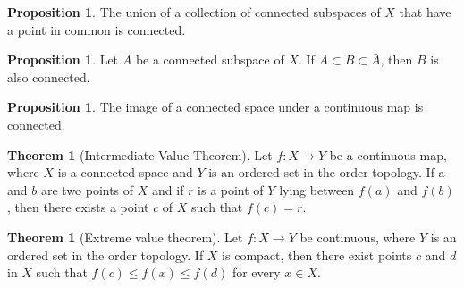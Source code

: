 \documentclass[12pt,a4paper]{book}
\theoremstyle{definition}
\newtheorem{theo}[defn]{Theorem}
\newtheorem{prop}[defn]{Proposition}
\begin{document}
\begin{prop}
    The union of a collection of connected subspaces of $X$ that have a point in common is connected.
\end{prop}
\begin{prop}
    Let $A$ be a connected subspace of $X$. If $A \subset B \subset \bar{A}$, then $B$ is also connected.
\end{prop}
\begin{prop}
    The image of a connected space under a continuous map is connected.
\end{prop}
\begin{theo}[Intermediate Value Theorem]
    Let $f: X \rightarrow Y$ be a continuous map, where $X$ is a connected space and $Y$ is an ordered set in the order topology. If a and $b$ are two points of $X$ and if $r$ is a point of $Y$ lying between $f(a)$ and $f(b)$, then there exists a point $c$ of $X$ such that $f(c)=r$.
\end{theo}
\begin{theo}[Extreme value theorem]
    Let $f: X \rightarrow Y$ be continuous, where $Y$ is an ordered set in the order topology. If $X$ is compact, then there exist points $c$ and $d$ in $X$ such that $f(c) \leq f(x) \leq f(d)$ for every $x \in X$.
\end{theo}
\end{document}
